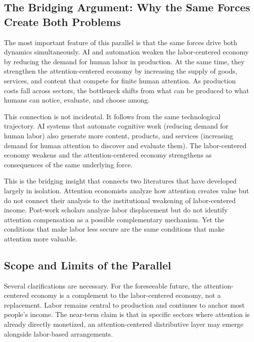 \documentclass[12pt, a4paper]{article}
\begin{document}
\subsection{The Bridging Argument: Why the Same Forces Create Both Problems}
\label{sec:ace-bridging}

The most important feature of this parallel is that the same forces drive both dynamics simultaneously. AI and automation weaken the labor-centered economy by reducing the demand for human labor in production. At the same time, they strengthen the attention-centered economy by increasing the supply of goods, services, and content that compete for finite human attention. As production costs fall across sectors, the bottleneck shifts from what can be produced to what humans can notice, evaluate, and choose among.

This connection is not incidental. It follows from the same technological trajectory. AI systems that automate cognitive work (reducing demand for human labor) also generate more content, products, and services (increasing demand for human attention to discover and evaluate them). The labor-centered economy weakens and the attention-centered economy strengthens as consequences of the same underlying force.

This is the bridging insight that connects two literatures that have developed largely in isolation. Attention economists \citep{simon1971, goldhaber1997, wu2016} analyze how attention creates value but do not connect their analysis to the institutional weakening of labor-centered income. Post-work scholars \citep{standing2017, brynjolfsson2014, ford2015} analyze labor displacement but do not identify attention compensation as a possible complementary mechanism. Yet the conditions that make labor less secure are the same conditions that make attention more valuable.

\subsection{Scope and Limits of the Parallel}
\label{sec:ace-limits}

Several clarifications are necessary. For the foreseeable future, the attention-centered economy is a complement to the labor-centered economy, not a replacement. Labor remains central to production and continues to anchor most people's income. The near-term claim is that in specific sectors where attention is already directly monetized, an attention-centered distributive layer may emerge alongside labor-based arrangements.
\end{document}
